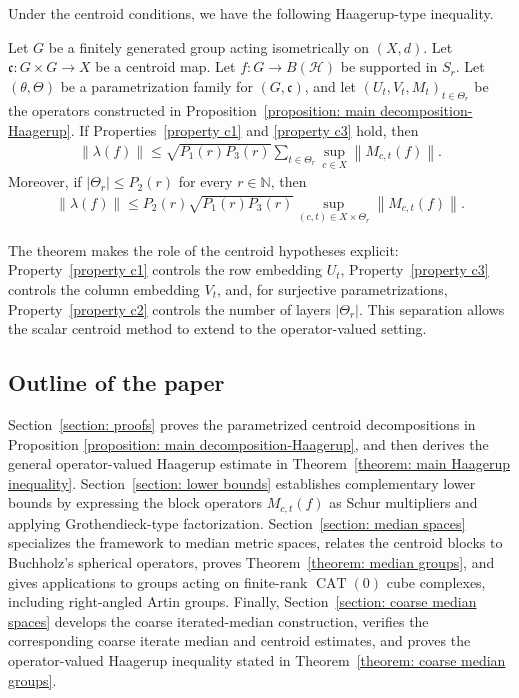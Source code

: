 \documentclass[12pt,reqno]{amsart}
\newcommand{\N}{\mathbb{N}}
\newcommand{\norm}[1]{\left\|#1\right\|}
\newcommand{\Hil}{\mathcal{H}}
\newcommand{\CAT}{\operatorname{CAT}(0)}
\numberwithin{equation}{section}
\begin{document}
Under the centroid conditions, we have the following Haagerup-type inequality.
\begin{theorem}\label{theorem: main Haagerup inequality}
    Let $G$ be a finitely generated group acting isometrically on $(X,d)$. Let $\mathfrak{c}: G\times G\to X$ be a centroid map.
    Let $f:G\to B(\Hil)$ be supported in $S_r$. Let $(\theta,\Theta)$ be a parametrization family for $(G,\mathfrak{c})$, and let $(U_t,V_t,M_t)_{t\in \Theta_r}$ be the operators constructed in Proposition~\ref{proposition: main decomposition-Haagerup}. If Properties~\ref{property c1} and \ref{property c3} hold, then
    \begin{align*}
        \norm{\lambda(f)}\le \sqrt{P_1(r)P_3(r)}\sum_{t\in \Theta_r}\sup_{c\in X}\norm{M_{c,t}(f)}.
    \end{align*}
    Moreover, if $|\Theta_r|\le P_2(r)$ for every $r\in\N$, then
    \begin{align*}
        \norm{\lambda(f)}\le P_2(r)\sqrt{P_1(r)P_3(r)}\sup_{(c,t)\in X\times \Theta_r}\norm{M_{c,t}(f)}.
    \end{align*}
\end{theorem}
The theorem makes the role of the centroid hypotheses explicit: Property~\ref{property c1} controls the row embedding $U_t$, Property~\ref{property c3} controls the column embedding $V_t$, and, for surjective parametrizations, Property~\ref{property c2} controls the number of layers $|\Theta_r|$. This separation allows the scalar centroid method to extend to the operator-valued setting.


\subsection*{Outline of the paper} Section~\ref{section: proofs} proves the parametrized centroid decompositions in Proposition \ref{proposition: main decomposition-Haagerup}, and then derives the general operator-valued Haagerup estimate in Theorem~\ref{theorem: main Haagerup inequality}. Section~\ref{section: lower bounds} establishes complementary lower bounds by expressing the block operators $M_{c,t}(f)$ as Schur multipliers and applying Grothendieck-type factorization. Section~\ref{section: median spaces} specializes the framework to median metric spaces, relates the centroid blocks to Buchholz's spherical operators, proves Theorem~\ref{theorem: median groups}, and gives applications to groups acting on finite-rank $\CAT$ cube complexes, including right-angled Artin groups. Finally, Section~\ref{section: coarse median spaces} develops the coarse iterated-median construction, verifies the corresponding coarse iterate median and centroid estimates, and proves the operator-valued Haagerup inequality stated in Theorem~\ref{theorem: coarse median groups}.
\end{document}
